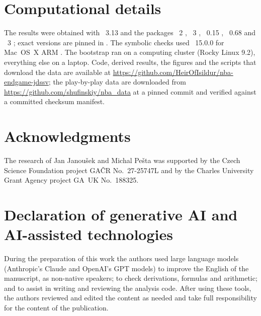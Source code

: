 \documentclass[article]{jdssv}
\begin{document}
\section*{Computational details}

The results were obtained with ~3.13 \citep{python} and the packages ~2
\citep{numpy}, ~3 \citep{pandas}, ~0.15 \citep{statsmodels},
~0.68 \citep{numba} and ~3 \citep{matplotlib}; exact versions are pinned in
. The symbolic checks used ~15.0.0 for Mac~OS~X ARM
\citep{mathematica}. The bootstrap ran on a computing cluster (Rocky Linux 9.2), everything else on a laptop.
Code, derived results, the figures and the scripts that download the data are available at
\url{https://github.com/HeirOfIsildur/nba-endgame-jdssv}; the play-by-play data are downloaded from
\url{https://github.com/shufinskiy/nba_data} at a pinned commit and verified against a committed checksum manifest.

\section*{Acknowledgments}

The research of Jan Janou\v{s}ek and Michal Pe\v{s}ta was supported by the Czech Science
Foundation project GA\v{C}R No.~27-25747L and by the Charles University Grant Agency project
GA~UK No.~188325.

\section*{Declaration of generative AI and AI-assisted technologies}

During the preparation of this work the authors used large language models (Anthropic's Claude and OpenAI's GPT
models) to improve the English of the manuscript, as non-native speakers; to check derivations, formulas and
arithmetic; and to assist in writing and reviewing the analysis code. After using these tools, the authors reviewed and
edited the content as needed and take full responsibility for the content of the publication.


\end{document}
